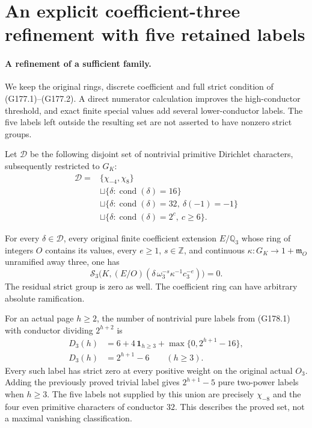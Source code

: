 \section{An explicit coefficient-three refinement with five retained labels}
\label{sec:coefficient-three-refined}

\paragraph{A refinement of a sufficient family.}
We keep the original rings, discrete coefficient and full strict condition
of (G177.1)--(G177.2).  A direct numerator calculation improves the
high-conductor threshold, and exact finite special values add several
lower-conductor labels.  The five labels left outside the resulting set
are not asserted to have nonzero strict groups.

Let $\mathscr D$ be the following disjoint set of nontrivial primitive
Dirichlet characters, subsequently restricted to $G_K$:
\[
 \begin{split}
 \mathscr D={}&\{\chi_{-4},\chi_8\}\\
 &\sqcup\{\delta:\operatorname{cond}(\delta)=16\}\\
 &\sqcup\{\delta:\operatorname{cond}(\delta)=32,\ \delta(-1)=-1\}\\
 &\sqcup\{\delta:\operatorname{cond}(\delta)=2^c,\ c\geq6\}.
 \end{split}\tag{G178.1}
\]

\begin{theorem}
\label{AC-G178}
For every $\delta\in\mathscr D$, every original finite coefficient
extension $E/\mathbb Q_3$ whose ring of integers $O$ contains its values,
every $e\geq1$, $s\in\mathbb Z$, and continuous
$\kappa:G_K\to1+\mathfrak m_O$ unramified away three, one has
\[
 \mathcal S_3\bigl(K,(E/O)
          (\delta\,\omega_3^{-s}\kappa^{-1}c_3^{-e})\bigr)=0.
 \tag{G178.2}
\]
The residual strict group is zero as well.  The coefficient ring can
have arbitrary absolute ramification.

For an actual page $h\geq2$, the number of nontrivial pure labels from
(G178.1) with conductor dividing $2^{h+2}$ is
\[
 \begin{aligned}
 D_3(h)&=6+4\,\mathbf1_{h\geq3}
                 +\max\{0,2^{h+1}-16\},\\
 D_3(h)&=2^{h+1}-6\qquad(h\geq3).
 \end{aligned}\tag{G178.3}
\]
Every such label has strict zero at every positive weight on the original
actual $O_3$.  Adding the previously proved trivial label gives
$2^{h+1}-5$ pure two-power labels when $h\geq3$.
The five labels not supplied by this union are precisely $\chi_{-8}$
and the four even primitive characters of conductor $32$.
This describes the proved set, not a maximal vanishing classification.
\end{theorem}

